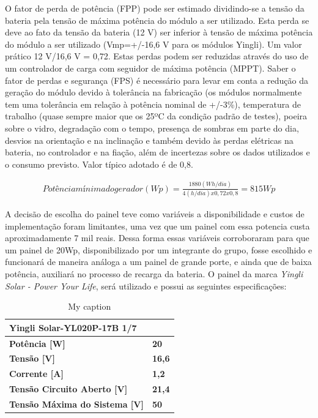         O fator de perda de potência (FPP) pode ser estimado dividindo-se a tensão da bateria pela tensão de máxima potência do módulo a ser utilizado. Esta perda se deve ao fato da tensão da bateria (12 V) ser inferior à tensão de máxima potência do módulo a ser utilizado (Vmp=+/-16,6 V para os módulos Yingli). Um valor prático 12 V/16,6 V = 0,72. Estas perdas podem ser reduzidas através do uso de um controlador de carga com seguidor de máxima potência (MPPT).
        Saber o fator de perdas e segurança (FPS) é necessário para levar em conta a redução da geração do módulo devido à tolerância na fabricação (os módulos normalmente tem uma tolerância em relação à potência nominal de +/-3\%), temperatura de trabalho (quase sempre maior que os 25ºC da condição padrão de testes), poeira sobre o vidro, degradação com o tempo, presença de sombras em parte do dia, desvios na orientação e na inclinação e também devido às perdas elétricas na bateria, no controlador e na fiação, além de incertezas sobre os dados utilizados e o consumo previsto. Valor típico adotado é de 0,8.
        
\begin{eqnarray}
Potência mínima do gerador (Wp) = \frac{\text{1880}(Wh/dia) }{\text{4} (h/dia) x 0,72 x 0,8} = 815 Wp
\end{eqnarray}
        
        A decisão de escolha do painel teve como variáveis a disponibilidade e custos de implementação foram limitantes, uma vez que um painel com essa potencia custa aproximadamente 7 mil reais. Dessa forma essas variáveis corroboraram para que um painel de 20Wp, disponibilizado por um integrante do grupo, fosse escolhido e funcionará de maneira análoga a um painel de grande porte, e ainda que de baixa potência,  auxiliará no processo de recarga da bateria.
        O painel da marca \textit{Yingli Solar - Power Your Life},  será utilizado e possui as seguintes especificações:
        
\begin{table}[]
\centering
\caption{My caption}
\label{my-label}
\begin{tabular}{|l|l}
\cline{1-1}
\textbf{Yingli Solar-YL020P-17B 1/7} &                                    \\ \hline
\textbf{Potência {[}W{]}}                                                           & \multicolumn{1}{l|}{\textbf{20}}   \\ \hline
\textbf{Tensão {[}V{]}}                                                             & \multicolumn{1}{l|}{\textbf{16,6}} \\ \hline
\textbf{Corrente {[}A{]}}                                                           & \multicolumn{1}{l|}{\textbf{1,2}}  \\ \hline
\textbf{Tensão Circuito Aberto {[}V{]}}                                             & \multicolumn{1}{l|}{\textbf{21,4}} \\ \hline
\textbf{Tensão Máxima do Sistema {[}V{]}}                                           & \multicolumn{1}{l|}{\textbf{50}}   \\ \hline
\end{tabular}
\end{table}
        
